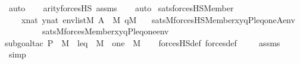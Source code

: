 \begin{isabellebody}
\ auto{\isacharbrackleft}{\kern0pt}{}{\isacharbrackright}{\kern0pt}\isanewline
\ \ \isamarkupfalse%
\ arity{\isacharunderscore}{\kern0pt}forcesHS{\isacharprime}{\kern0pt}\ assms\isanewline
\ \ \isamarkupfalse%
\ auto%
\endisatagproof
{\isafoldproof}%
%
\isadelimproof
\isanewline
%
\endisadelimproof
\isanewline
{}\isamarkupfalse%
\ sats{\isacharunderscore}{\kern0pt}forcesHS{\isacharunderscore}{\kern0pt}Member\ {\isacharcolon}{\kern0pt}\isanewline
\ \ \ \ {\isachardoublequoteopen}x{\isasymin}nat{\isachardoublequoteclose}\ {\isachardoublequoteopen}y{\isasymin}nat{\isachardoublequoteclose}\ {\isachardoublequoteopen}env{\isasymin}list{\isacharparenleft}{\kern0pt}M{\isacharparenright}{\kern0pt}{\isachardoublequoteclose}\ {\isachardoublequoteopen}A\ {\isasymin}\ M{\isachardoublequoteclose}\ {\isachardoublequoteopen}q{\isasymin}M{\isachardoublequoteclose}\isanewline
\ \ \ {\isachardoublequoteopen}sats{\isacharparenleft}{\kern0pt}M{\isacharcomma}{\kern0pt}forcesHS{\isacharparenleft}{\kern0pt}Member{\isacharparenleft}{\kern0pt}x{\isacharcomma}{\kern0pt}y{\isacharparenright}{\kern0pt}{\isacharparenright}{\kern0pt}{\isacharcomma}{\kern0pt}{\isacharbrackleft}{\kern0pt}q{\isacharcomma}{\kern0pt}P{\isacharcomma}{\kern0pt}leq{\isacharcomma}{\kern0pt}one{\isacharcomma}{\kern0pt}A{\isacharbrackright}{\kern0pt}{\isacharat}{\kern0pt}env{\isacharparenright}{\kern0pt}\ {\isasymlongleftrightarrow}\isanewline
\ \ \ \ \ \ \ \ \ sats{\isacharparenleft}{\kern0pt}M{\isacharcomma}{\kern0pt}forces{\isacharparenleft}{\kern0pt}Member{\isacharparenleft}{\kern0pt}x{\isacharcomma}{\kern0pt}y{\isacharparenright}{\kern0pt}{\isacharparenright}{\kern0pt}{\isacharcomma}{\kern0pt}{\isacharbrackleft}{\kern0pt}q{\isacharcomma}{\kern0pt}P{\isacharcomma}{\kern0pt}leq{\isacharcomma}{\kern0pt}one{\isacharbrackright}{\kern0pt}{\isacharat}{\kern0pt}env{\isacharparenright}{\kern0pt}{\isachardoublequoteclose}\ \isanewline
%
\isadelimproof
\ \ %
\endisadelimproof
%
\isatagproof
{}\isamarkupfalse%
{\isacharparenleft}{\kern0pt}subgoal{\isacharunderscore}{\kern0pt}tac\ {\isachardoublequoteopen}P\ {\isasymin}\ M\ {\isasymand}\ leq\ {\isasymin}\ M\ {\isasymand}\ one\ {\isasymin}\ M{\isachardoublequoteclose}{\isacharparenright}{\kern0pt}\isanewline
\ \ \isamarkupfalse%
\ forcesHS{\isacharunderscore}{\kern0pt}def\ forces{\isacharunderscore}{\kern0pt}def\ \isanewline
\ \ \isamarkupfalse%
\ assms\isanewline
\ \ \ \isamarkupfalse%
\ simp\isanewline

\end{isabellebody}
